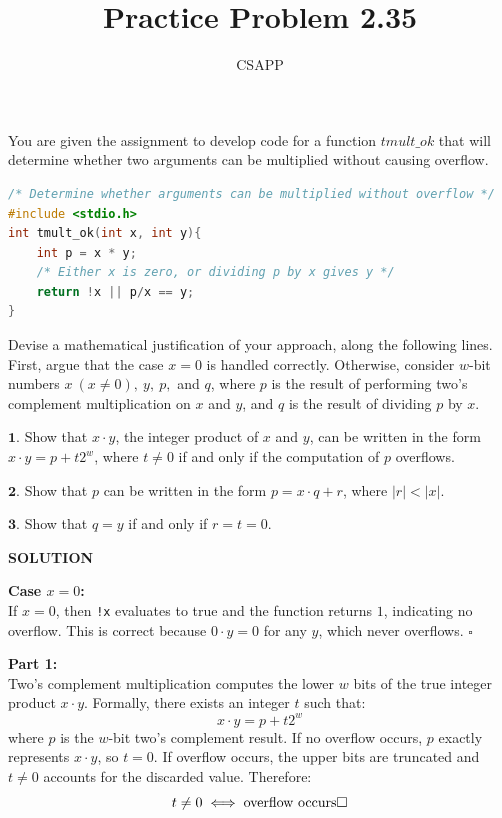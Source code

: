 \documentclass{article}
\title{Practice Problem 2.35}
\author{CSAPP}
\begin{document}
\maketitle

\begin{flushleft}
    You are given the assignment to develop code for a function $tmult\_ok$ that will
    determine whether two arguments can be multiplied without causing overflow.
\small
\begin{lstlisting}[language=c]
/* Determine whether arguments can be multiplied without overflow */
#include <stdio.h>
int tmult_ok(int x, int y){
    int p = x * y;
    /* Either x is zero, or dividing p by x gives y */
    return !x || p/x == y;
}
\end{lstlisting}

Devise a mathematical justification of your approach, along the following lines.
First, argue that the case $x = 0$ is handled correctly. Otherwise, consider $w$-bit
numbers $x\ (x \neq 0),\ y,\ p,$ and $q$, where $p$ is the result of performing two's complement
multiplication on $x$ and $y$, and $q$ is the result of dividing $p$ by $x$.

\bigskip
$\mathbf{1.}$ Show that $x \cdot y$, the integer product of $x$ and $y$, can be written in the form
$x \cdot y = p + t2^w$, where $t \neq 0$ if and only if the computation of $p$ overflows.

$\mathbf{2.}$ Show that $p$ can be written in the form $p = x \cdot q + r$, where $|r| < |x|$.

$\mathbf{3.}$ Show that $q = y$ if and only if $r = t = 0$.

\bigskip
\textbf{\normalsize SOLUTION}

\bigskip
\textbf{Case $x = 0$:}\\
If $x = 0$, then \texttt{!x} evaluates to true and the function returns $1$, indicating no overflow.
This is correct because $0 \cdot y = 0$ for any $y$, which never overflows. \hfill$\square$

\bigskip
\textbf{Part 1:}\\
Two's complement multiplication computes the lower $w$ bits of the true integer product $x \cdot y$.
Formally, there exists an integer $t$ such that:
\begin{equation}
    x \cdot y = p + t2^w
\end{equation}
where $p$ is the $w$-bit two's complement result. If no overflow occurs, $p$ exactly represents
$x \cdot y$, so $t = 0$. If overflow occurs, the upper bits are truncated and $t \neq 0$ accounts
for the discarded value. Therefore:
\begin{equation*}
    t \neq 0 \iff \text{overflow occurs} \hfill\square
\end{equation*}


\end{flushleft}
\end{document}
